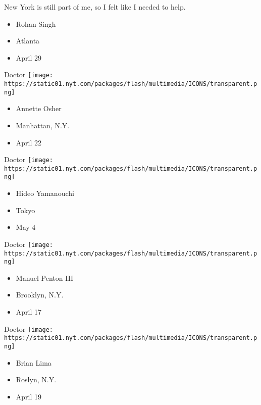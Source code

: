 New York is still part of me, so I felt like I needed to help.

\begin{itemize}
\tightlist
\item
  Rohan Singh
\item
  Atlanta
\item
  April 29
\end{itemize}

\protect\hyperlink{item-annette-osher}{}

Doctor
\texttt{[image: https://static01.nyt.com/packages/flash/multimedia/ICONS/transparent.png]}

\begin{itemize}
\tightlist
\item
  Annette Osher
\item
  Manhattan, N.Y.
\item
  April 22
\end{itemize}

\protect\hyperlink{item-hideo-yamanouchi}{}

Doctor
\texttt{[image: https://static01.nyt.com/packages/flash/multimedia/ICONS/transparent.png]}

\begin{itemize}
\tightlist
\item
  Hideo Yamanouchi
\item
  Tokyo
\item
  May 4
\end{itemize}

\protect\hyperlink{item-manuel-penton-iii}{}

Doctor
\texttt{[image: https://static01.nyt.com/packages/flash/multimedia/ICONS/transparent.png]}

\begin{itemize}
\tightlist
\item
  Manuel Penton III
\item
  Brooklyn, N.Y.
\item
  April 17
\end{itemize}

\protect\hyperlink{item-brian-lima}{}

Doctor
\texttt{[image: https://static01.nyt.com/packages/flash/multimedia/ICONS/transparent.png]}

\begin{itemize}
\tightlist
\item
  Brian Lima
\item
  Roslyn, N.Y.
\item
  April 19
\end{itemize}

